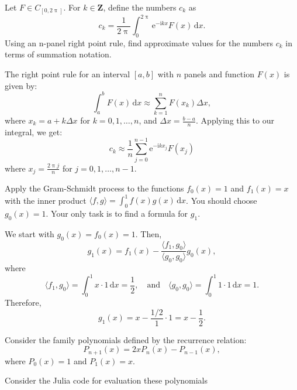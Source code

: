 \documentclass[12pt,fleqn,answers]{exam}
\newcommand{\integers}{\mathbf{Z}}
\begin{document}
\begin{questions}
\question [5]  Let $F \in C_{[0,2 \uppi]}$. For $k \in \integers$, define the numbers $c_k$ as
\[c_k = \frac{1}{2 \uppi} \int_0^{2 \uppi} \mathrm{e}^{-\mathrm{i} k x} F(x) \, \mathrm{d} x.\]
Using an n-panel right point rule, find approximate values for the numbers $c_k$ in terms of summation notation.
\begin{solution}[3.5in]
The right point rule for an interval $[a,b]$ with $n$ panels and function $F(x)$ is given by:
\[\int_a^b F(x) \, \mathrm{d} x \approx \sum_{k=1}^n F(x_k) \Delta x,\]
where $x_k = a + k \Delta x$ for $k = 0, 1, \ldots, n$, and $\Delta x = \frac{b-a}{n}$. 
Applying this to our integral, we get:
\[c_k \approx \frac{1}{n} \sum_{j=0}^{n-1} \mathrm{e}^{-\mathrm{i} k x_j} F(x_j) \]
where $x_j = \frac{2\uppi j}{n}$ for $j = 0, 1, \ldots, n-1$.
\end{solution}

\newpage

\question [5] Apply the Gram-Schmidt process to the functions $f_0(x) = 1$ and $f_1(x) = x$ with the inner product
$\langle f,g \rangle = \int_0^1 f(x) g(x) \, \mathrm{d} x$. You should choose $g_0(x) = 1$. Your only task is 
to find a formula for $g_1$.
\begin{solution}[3.5in]
We start with $g_0(x) = f_0(x) = 1$. Then,
\[g_1(x) = f_1(x) - \frac{\langle f_1, g_0 \rangle}{\langle g_0, g_0 \rangle} g_0(x),\]
where 
\[\langle f_1, g_0 \rangle = \int_0^1 x \cdot 1 \, \mathrm{d} x = \frac{1}{2}, \quad \text{and} \quad \langle g_0, g_0 \rangle = \int_0^1 1 \cdot 1 \, \mathrm{d} x = 1.\]
Therefore,
\[g_1(x) = x - \frac{1/2}{1} \cdot 1 = x - \frac{1}{2}.\]
\end{solution}

\question  Consider the family polynomials defined by the recurrence relation:
\[ P_{n+1}(x) = 2 x P_n(x) - P_{n-1}(x), \]
where \( P_0(x) = 1 \) and \( P_1(x) = x \). 


\question[5] Consider the Julia code for evaluation these polynomials


\end{questions}
\end{document}
